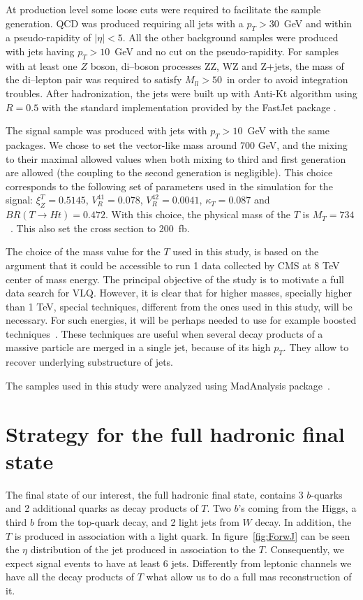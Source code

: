 At production level some loose cuts were required to facilitate the sample generation. QCD was produced requiring all jets with a $p_{T}>30$~GeV and within a pseudo-rapidity of $|\eta|<5$. All the other background samples were produced with jets having $p_{T}>10$~GeV and no cut on the pseudo-rapidity. For samples with at least one $Z$ boson, di--boson processes ZZ, WZ and Z+jets, the mass of the di--lepton pair was required to satisfy $M_{ll}>50$~\GeVcc in order to avoid integration troubles. After hadronization, the jets were built up with Anti-Kt algorithm using $R=0.5$ with the standard implementation provided by the FastJet package \cite{Cacciari:2011ma}.

The signal sample was produced with jets with $p_{T}>10$~GeV with the same packages. We chose to set the vector-like mass around 700 GeV, and the mixing to their maximal allowed values when both mixing to third and first generation are allowed (the coupling to the second generation is negligible). This choice corresponds to the following set of parameters used in the simulation for the signal: $\xi_Z^{T}=0.5145$, $V_{R}^{41}=0.078$, $V_{R}^{42}=0.0041$, $\kappa_{T}=0.087$ and $BR(T \to H t)=0.472$. With this choice, the physical mass of the $T$ is $M_{T}=734$~\GeVcc. This also set the cross section to 200~fb. 

The choice of the mass value for the $T$ used in this study, is based on the argument that it could be accessible to run 1 data collected by CMS at 8 TeV center of mass energy. The principal objective of the study is to motivate a full data search for VLQ. However, it is clear that for higher masses, specially higher than 1 TeV, special techniques, different from the ones used in this study, will be necessary. For such energies, it will be perhaps needed to use for example boosted techniques~\cite{CMS:2013vca, ATLAS-CONF-2013-084, Usai:2015vva}. These techniques are useful when several decay products of a massive particle are merged in a single jet, because of its high $p_{T}$. They allow to recover underlying substructure of jets. 

The samples used in this study were analyzed using MadAnalysis package~\cite{Conte:2012fm, Conte:2014zja}.

\section{Strategy for the full hadronic final state}
\label{sec:Pstra}

The final state of our interest, the full hadronic final state, contains 3 $b$-quarks and 2 additional quarks as decay products of $T$. Two $b$'s coming from the Higgs, a third $b$ from the top-quark decay, and 2 light jets from $W$ decay. In addition, the $T$ is produced in association with a light quark. In figure~\ref{fig:ForwJ} can be seen the $\eta$ distribution of the jet produced in association to the $T$. Consequently, we expect signal events to have at least 6 jets. Differently from leptonic channels we have all the decay products of $T$ what allow us to do a full mas reconstruction of it.

